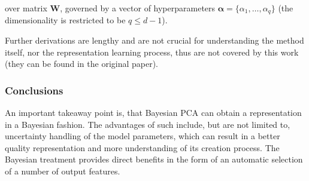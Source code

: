 \noindent over matrix $\mathbf{W}$, governed by a vector of hyperparameters $\boldsymbol{\alpha} = \{\alpha_1, \dots, \alpha_q\}$ (the dimensionality is restricted to be $q \leq d - 1$).

\vspace{\baselineskip}
Further derivations are lengthy and are not crucial for understanding the method itself, nor the representation learning process, thus are not covered by this work (they can be found in the original paper).

\subsubsection{Conclusions}
An important takeaway point is, that Bayesian PCA can obtain a representation in a Bayesian fashion. The advantages of such include, but are not limited to, uncertainty handling of the model parameters, which can result in a better quality representation and more understanding of its creation process. The Bayesian treatment provides direct benefits in the form of an automatic selection of a number of output features.



